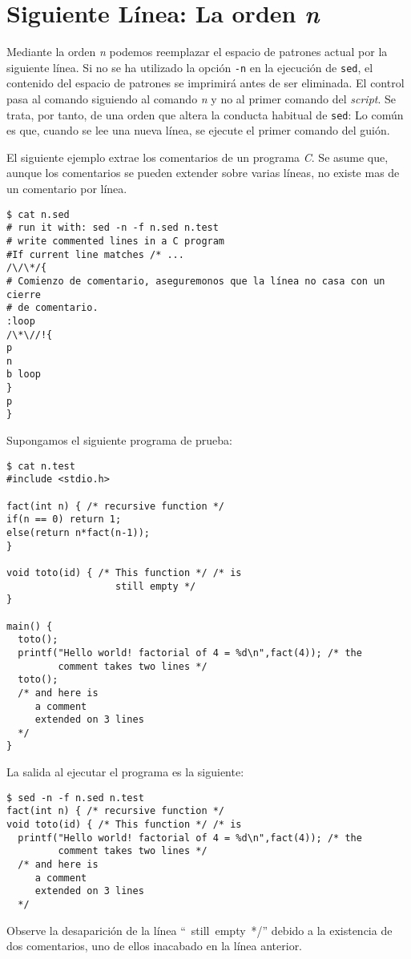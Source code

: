 \section{Siguiente Línea: La orden {\it n}}
Mediante la orden {\it n} podemos reemplazar el espacio de
patrones actual por la siguiente línea. Si no se ha utilizado
la opción \verb|-n| en la ejecución de \verb|sed|, el contenido del espacio
de patrones se imprimirá antes de ser eliminada. El control
pasa al comando siguiendo al comando {\it n} y no al primer
comando del {\it script}. Se trata, por tanto, de una orden que
altera la conducta habitual de \verb|sed|: Lo común es que, cuando se lee una nueva
línea, se ejecute el primer comando del guión.

El siguiente ejemplo extrae los comentarios de un programa {\it C}.
Se asume que, aunque los comentarios se pueden extender sobre
varias líneas, no existe mas de un comentario por línea.
\begin{verbatim}
$ cat n.sed
# run it with: sed -n -f n.sed n.test
# write commented lines in a C program
#If current line matches /* ...
/\/\*/{
# Comienzo de comentario, aseguremonos que la línea no casa con un cierre
# de comentario.
:loop
/\*\//!{
p
n
b loop
}
p
}                
\end{verbatim}
Supongamos el siguiente programa de prueba:
\begin{verbatim}
$ cat n.test
#include <stdio.h>
 
fact(int n) { /* recursive function */
if(n == 0) return 1;
else(return n*fact(n-1));
}
 
void toto(id) { /* This function */ /* is
                   still empty */
}
 
main() {
  toto();
  printf("Hello world! factorial of 4 = %d\n",fact(4)); /* the
         comment takes two lines */
  toto();
  /* and here is
     a comment
     extended on 3 lines
  */
}                         
\end{verbatim}
La salida al ejecutar el programa es la siguiente:
\begin{verbatim}
$ sed -n -f n.sed n.test
fact(int n) { /* recursive function */
void toto(id) { /* This function */ /* is
  printf("Hello world! factorial of 4 = %d\n",fact(4)); /* the
         comment takes two lines */
  /* and here is
     a comment
     extended on 3 lines
  */                   
\end{verbatim}
Observe la desaparición de la línea \mbox{`` still empty */''} 
debido a la existencia de dos comentarios, uno de ellos inacabado 
en la línea anterior. 

